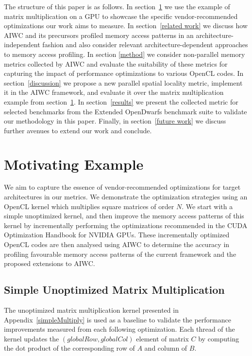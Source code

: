 \documentclass[review=false, sigchi]{acmart}
\begin{document}
	The structure of this paper is as follows.
	In section~\ref{motivating example} we use the example of matrix multiplication on a GPU to showcase the specific vendor-recommended optimizations our work aims to measure.
	In section~\ref{related work} we discuss how AIWC and its precursors profiled memory access patterns in an architecture-independent fashion and also consider relevant architecture-dependent approaches to memory access profiling.
	In section \ref{method} we consider non-parallel memory metrics collected by AIWC and evaluate the suitability of these metrics for capturing the impact of performance optimizations to various OpenCL codes.
	In section~\ref{discussion} we propose a new parallel spatial locality metric, implement it in the AIWC framework, and evaluate it over the matrix multiplication example from section~\ref{motivating example}.
	In section~\ref{results} we present the collected metric for selected benchmarks from the Extended OpenDwarfs benchmark suite to validate our methodology in this paper.
	Finally, in section~\ref{future work} we discuss further avenues to extend our work and conclude.
	
	\section{Motivating Example} \label{motivating example}
	
	We aim to capture the essence of vendor-recommended optimizations for target architectures in our metrics.
	We demonstrate the optimization strategies using an OpenCL kernel which multiplies square matrices of order $N$.
	We start with a simple unoptimized kernel, and then improve the memory access patterns of this kernel by incrementally performing the optimizations recommended in the CUDA Optimization Handbook \cite{cudaoptimisation} for NVIDIA GPUs.
	These incrementally optimized OpenCL codes are then analysed using AIWC to determine the accuracy in profiling favourable memory access patterns of the current framework and the proposed extensions to AIWC.
	
	\subsection{Simple Unoptimized Matrix Multiplication}
	
	The unoptimized matrix multiplication kernel presented in Appendix~\ref{simpleMultiply} is used as a baseline to validate the performance improvements measured from each following optimization.
	Each thread of the kernel updates the $(globalRow, globalCol)$ element of matrix $C$ by computing the dot product of the corresponding row of $A$ and column of $B$.
	
\end{document}
